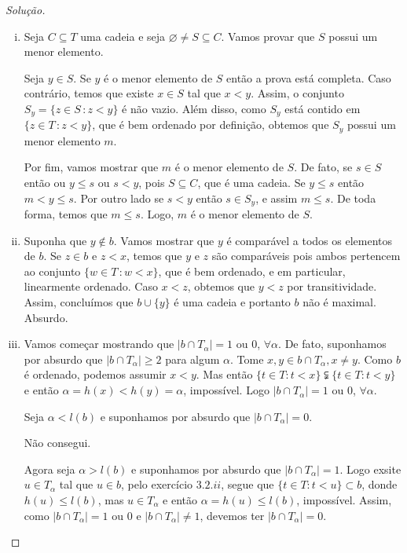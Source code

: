 \documentclass[a4paper]{article}
\begin{document}
  \begin{proof}[Solução]\hfill
    \begin{enumerate}[(i)]
      \item  Seja \(C\subseteq T\) uma cadeia e seja
        \(\varnothing\not = S\subseteq C\). Vamos provar que \(S\) possui um menor
        elemento.

        Seja \(y\in S\). Se \(y\) é o menor elemento de \(S\) então a prova está
        completa. Caso contrário, temos que existe \(x\in S\) tal que \(x<y\). Assim,
         o conjunto \(S_{y} =\{z\in S\,\colon z<y\}\) é não vazio. Além disso, como
         \(S_y\) está contido em \(\{z\in T\,\colon z<y\}\), que é bem ordenado por
         definição, obtemos que \(S_y\) possui um menor elemento \(m\).

         Por fim, vamos mostrar que \(m\) é o menor elemento de \(S\). De fato, se
         \(s\in S\) então ou \(y \leq s\) ou \(s<y\), pois \(S\subseteq C\), que é uma cadeia.
         Se \(y \leq s\) então \(m<y\leq s\). Por outro lado se
         \(s<y\) então \(s\in S_{y}\), e assim \(m\leq s\). De toda forma, temos que
         \(m\leq s\). Logo,  \(m\) é o menor elemento de \(S\).

       \item Suponha que \(y\not\in b\). Vamos mostrar que \(y\) é comparável
        a todos os elementos de \(b\). Se \(z\in b\) e \(z < x\), temos que
        \(y\) e \(z\) são comparáveis pois ambos pertencem ao conjunto \(\{w\in
        T\,\colon w< x \}\), que é bem ordenado, e em particular, linearmente
        ordenado. Caso \(x<z\), obtemos que \(y<z\) por transitividade. Assim,
        concluímos que \(b\cup\{y\}\) é uma cadeia e portanto \(b\) não é
        maximal. Absurdo.

        \item \par
Vamos começar mostrando que $|b \cap T_\alpha| = 1$ ou $0$, $\forall \alpha$. De fato, suponhamos por absurdo que $|b \cap T_\alpha| \geq 2$ para algum $\alpha$. Tome $x,y \in b \cap T_\alpha, x \neq y$. Como $b$ é ordenado, podemos assumir $x < y$. Mas então $\{t \in T: t < x\} \subsetneqq \{t \in T: t < y\}$ e então  $\alpha = h(x) < h(y) = \alpha$, impossível. Logo $|b \cap T_\alpha| = 1$ ou $0$, $\forall \alpha$.
\par 
Seja $\alpha < l(b)$ e suponhamos por absurdo que $|b \cap T_\alpha | = 0$.
\par 
Não consegui.
\par 
Agora seja $\alpha > l(b)$ e suponhamos por absurdo que $|b \cap T_\alpha| = 1$. Logo exsite $u \in T_\alpha$ tal que $u \in b$, pelo exercício $3.2.ii$, segue que $\{t \in T: t < u\} \subset b$, donde $h(u) \leq l(b)$, mas $u \in T_\alpha$ e então $\alpha = h(u) \leq l(b)$, impossível. Assim, como $|b \cap T_\alpha| = 1$ ou $0$ e $|b \cap T_\alpha| \neq 1$, devemos ter $|b \cap T_\alpha| = 0$.
        

\end{enumerate}
\end{proof}
\end{document}
